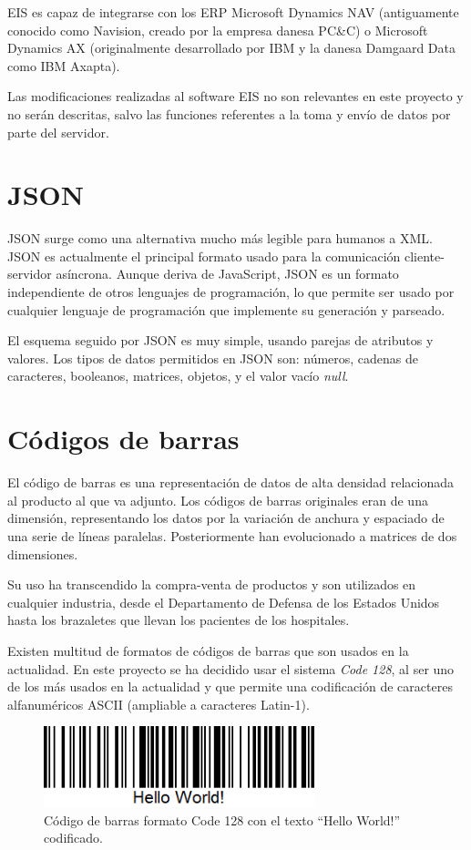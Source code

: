 EIS es capaz de integrarse con los ERP Microsoft Dynamics NAV (antiguamente conocido como Navision, creado por la empresa danesa PC\&C) o Microsoft Dynamics AX (originalmente desarrollado por IBM y la danesa Damgaard Data como IBM Axapta).

Las modificaciones realizadas al software EIS no son relevantes en este proyecto y no serán descritas, salvo las funciones referentes a la toma y envío de datos por parte del servidor.

\section{JSON}
JSON \cite{JSON} surge como una alternativa mucho más legible para humanos a XML. JSON es actualmente el principal formato usado para la comunicación cliente-servidor asíncrona. Aunque deriva de JavaScript, JSON es un formato independiente de otros lenguajes de programación, lo que permite ser usado por cualquier lenguaje de programación que implemente su generación y parseado.

El esquema seguido por JSON es muy simple, usando parejas de atributos y valores. Los tipos de datos permitidos en JSON son: números, cadenas de caracteres, booleanos, matrices, objetos, y el valor vacío \textit{null}.

\section{Códigos de barras}
El código de barras es una representación de datos de alta densidad relacionada al producto al que va adjunto. Los códigos de barras originales eran de una dimensión, representando los datos por la variación de anchura y espaciado de una serie de líneas paralelas. Posteriormente han evolucionado a matrices de dos dimensiones.

Su uso ha transcendido la compra-venta de productos y son utilizados en cualquier industria, desde el Departamento de Defensa de los Estados Unidos hasta los brazaletes que llevan los pacientes de los hospitales.

Existen multitud de formatos de códigos de barras que son usados en la actualidad. En este proyecto se ha decidido usar el sistema \textit{Code 128}, al ser uno de los más usados en la actualidad y que permite una codificación de caracteres alfanuméricos ASCII (ampliable a caracteres Latin-1).

\begin{figure}[h]
	\centering
		\includegraphics[width=0.7\textwidth]{./img/barcode.png}
	\caption{Código de barras formato Code 128 con el texto ``Hello World!'' codificado.}
\end{figure}

\chapterend